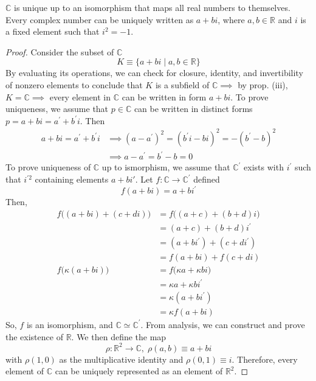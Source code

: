   \begin{theorem}
    $\mathbb{C}$ is unique up to an isomorphism that maps all real numbers to themselves. Every complex number can be uniquely written as $a + bi$, where $a, b \in \mathbb{R}$ and $i$ is a fixed element such that $i^2 = -1$. 
  \end{theorem}
  \begin{proof}
    Consider the subset of $\mathbb{C}$
    \begin{equation}
      K \equiv \{ a + bi \; | \; a, b \in \mathbb{R}\}
    \end{equation}
    By evaluating its operations, we can check for closure, identity, and invertibility of nonzero elements to conclude that $K$ is a subfield of $\mathbb{C} \implies$ by prop. (iii), $K = \mathbb{C} \implies$ every element in $\mathbb{C}$ can be written in form $a + bi$. To prove uniqueness, we assume that $p \in \mathbb{C}$ can be written in distinct forms $p = a + bi = a^{\prime} + b^\prime i$. Then
    \begin{align*}
       a + bi = a^{\prime} + b^\prime i & \implies (a - a^\prime)^2 = (b^\prime i - b i)^2 = - (b^\prime - b)^2 \\
       & \implies a - a^\prime = b^\prime - b = 0
    \end{align*}
    To prove uniqueness of $\mathbb{C}$ up to ismorphism, we assume that $\mathbb{C}^\prime$ exists with $i^\prime$ such that $i^{\prime 2}$ containing elements $a + b i'$. Let $f: \mathbb{C} \longrightarrow \mathbb{C}^\prime$ defined 
    \begin{equation}
      f( a + bi) = a + bi^\prime
    \end{equation}
    Then, 
    \begin{align*}
      f\big((a + b i) + (c + d i) \big) & = f\big( (a + c) + (b + d)i \big) \\
      & = (a + c) + (b + d) i^\prime \\
      & = (a + b i^\prime) + (c + d i^\prime) \\
      & = f(a + b i) + f( c + d i) \\
      f\big( \kappa (a + b i)\big) & = f\big( \kappa a + \kappa b i\big) \\
      & = \kappa a + \kappa b i^\prime \\
      & = \kappa (a + b i^\prime) \\
      & = \kappa f(a + b i)
    \end{align*}
    So, $f$ is an isomorphism, and $\mathbb{C} \simeq \mathbb{C}^\prime$. From analysis, we can construct and prove the existence of $\mathbb{R}$. We then define the map
    \begin{equation}
      \rho: \mathbb{R}^2 \longrightarrow \mathbb{C}, \; \rho(a, b) \equiv a + bi
    \end{equation}
    with $\rho(1, 0)$ as the multiplicative identity and $\rho(0,1) \equiv i$. Therefore, every element of $\mathbb{C}$ can be uniquely represented as an element of $\mathbb{R}^2$. 
  \end{proof}

